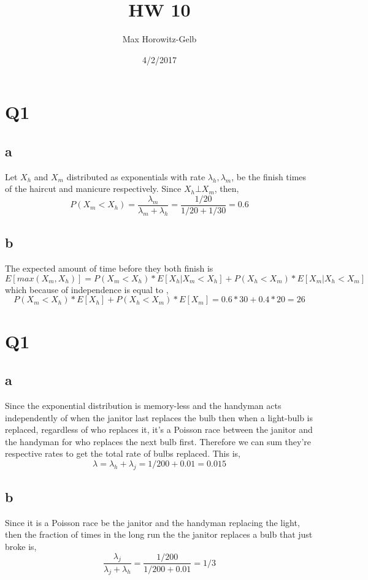 \documentclass{article}
\title{HW 10}
\author{Max Horowitz-Gelb}
\date{4/2/2017}
\begin{document}
\maketitle

\section*{Q1}
\subsection*{a}
Let $X_h$ and $X_m$ distributed as exponentials with rate $\lambda_h, \lambda_m$, be the finish times  of the haircut and manicure respectively. 
Since $X_h \bot X_m$, then,
$$
P(X_m < X_h) = \frac{\lambda_m}{\lambda_m + \lambda_h} = \frac{1/20}{1/20 + 1/30} = 0.6
$$

\subsection*{b}
The expected amount of time before they both finish is 
$$
E[max(X_m, X_h)] = P(X_m < X_h) * E[X_h | X_m < X_h] + P(X_h < X_m) * E[X_m | X_h < X_m] 
$$
which because of independence is equal to ,
$$
P(X_m < X_h) * E[X_h] + P(X_h < X_m) * E[X_m] = 0.6 * 30 + 0.4 *20 =  26
$$

\section*{Q1}
\subsection*{a}
Since the exponential distribution is memory-less and the handyman acts independently of when the janitor last replaces the bulb then when a light-bulb is replaced, regardless of who replaces it, it's a Poisson race between the janitor and the handyman for who replaces the next bulb first. Therefore we can sum they're respective rates to get the total rate of bulbs replaced. 
This is,
$$
\lambda = \lambda_h + \lambda_j = 1/200 + 0.01 = 0.015
$$

\subsection*{b}
Since it is a Poisson race be the janitor and the handyman replacing the light, then the fraction of times in the long run the the janitor replaces a bulb that just broke is,
$$
\frac{\lambda_j}{\lambda_j + \lambda_h} = \frac{1/200}{1/200 + 0.01} = 1/3
$$
\end{document}
